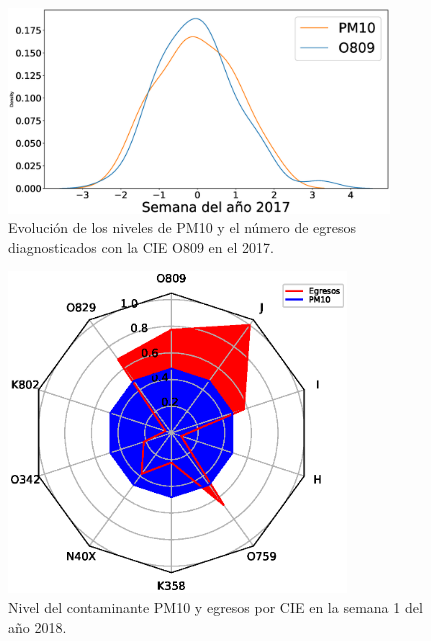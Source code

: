 \documentclass[a0]{sciposter} %
\begin{document}
\begin{multicols}{3}
\begin{figure}[h!]
\setcounter{figure}{1} %
\captionsetup{type=figure} %
\begin{center}
   \includegraphics[trim=60 0 0 0,clip,width=0.9\textwidth]{PM10_O809_2017.eps}
   \end{center}
    \caption{Evolución de los niveles de PM10 y el número de egresos diagnosticados con la CIE O809 en el 2017.}
    \label{serie_de_tiempo_2017_PM10}
\end{figure}

\begin{figure}[h!]
\setcounter{figure}{2} %
\captionsetup{type=figure} %
\begin{center}
   \includegraphics[trim=0 0 0 39,clip,width=0.8\textwidth]{spiderweb_PM10_2018_1.eps}
   \end{center}
    \caption{Nivel del contaminante PM10 y egresos por CIE en la semana 1 del año 2018.}
    \label{grafico_de_telaraña}
\end{figure}


\end{multicols}
\end{document}
